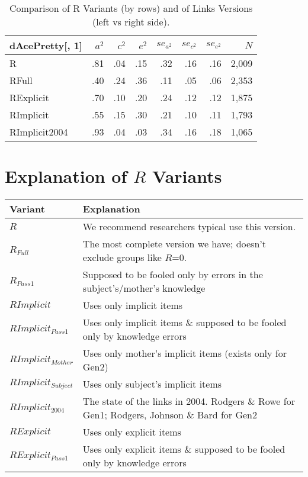 \documentclass{article}\usepackage[]{graphicx}\usepackage[]{color}
\begin{document}
\begin{table}[ht]
\centering
{\large
\begin{tabular}{l|rrr|rrr|r}
  \hline
dAcePretty[, 1] & $a^2$ & $c^2$ & $e^2$ & $se_{a^2}$ & $se_{c^2}$ & $se_{e^2}$ & $N$ \\ 
  \hline
R & .81 & .04 & .15 & .32 & .16 & .16 & 2,009 \\ 
  RFull & .40 & .24 & .36 & .11 & .05 & .06 & 2,353 \\ 
  RExplicit & .70 & .10 & .20 & .24 & .12 & .12 & 1,875 \\ 
  RImplicit & .55 & .15 & .30 & .21 & .10 & .11 & 1,793 \\ 
  RImplicit2004 & .93 & .04 & .03 & .34 & .16 & .18 & 1,065 \\ 
   \hline
\end{tabular}
}
\caption{Comparison of R Variants (by rows) and of Links Versions (left vs right side).} 
\end{table}


\section{Explanation of $R$ Variants}
\begin{tabular}{l l}
\textbf{Variant} & \textbf{Explanation} \\
\hline
$R$ & We recommend researchers typical use this version. \\
$R_{Full}$ & The most complete version we have; doesn't exclude groups like $R$=0. \\
$R_{Pass1}$ & Supposed to be fooled only by errors in the subject's/mother's knowledge \\
\hline
$RImplicit$ & Uses only implicit items \\
$RImplicit_{Pass1}$ & Uses only implicit items \& supposed to be fooled only by knowledge errors \\
$RImplicit_{Mother}$ & Uses only mother's implicit items (exists only for Gen2)\\
$RImplicit_{Subject}$ & Uses only subject's implicit items\\
$RImplicit_{2004}$ & The state of the links in 2004.  Rodgers \& Rowe for Gen1; Rodgers, Johnson \& Bard for Gen2 \\
\hline
$RExplicit$ & Uses only explicit items \\
$RExplicit_{Pass1}$ & Uses only explicit items \& supposed to be fooled only by knowledge errors \\

\hline
\end{tabular}
\end{document}
